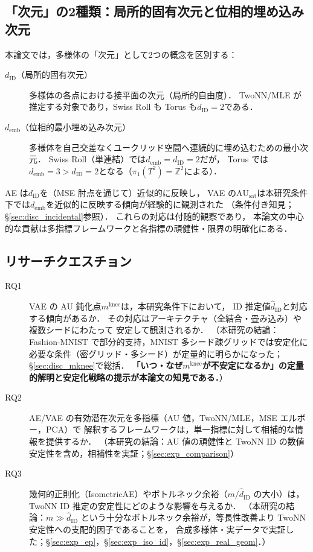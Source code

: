 \documentclass[11pt,a4paper]{jsarticle}
\newcommand{\dID}{d_{\mathrm{ID}}}
\newcommand{\AUsat}{\mathrm{AU}_{\mathrm{sat}}}
\newcommand{\mknee}{m^{\mathrm{knee}}}
\newcommand{\demb}{d_{\mathrm{emb}}}
\begin{document}
\subsection{「次元」の2種類：局所的固有次元と位相的埋め込み次元}\label{sec:intro_dim}

本論文では，多様体の「次元」として2つの概念を区別する：

\begin{description}
  \item[$\dID$（局所的固有次元）]
        多様体の各点における接平面の次元（局所的自由度）．
        TwoNN/MLE が推定する対象であり，Swiss Roll も Torus も$\dID = 2$である．
  \item[$\demb$（位相的最小埋め込み次元）]
        多様体を自己交差なくユークリッド空間へ連続的に埋め込むための最小次元．
        Swiss Roll（単連結）では$\demb = \dID = 2$だが，
        Torus では$\demb = 3 > \dID = 2$となる（$\pi_1(T^2) = \mathbb{Z}^2$による）．
\end{description}

AE は$\dID$を（MSE 肘点を通じて）近似的に反映し，
VAE の$\AUsat$は本研究条件下では$\demb$を近似的に反映する傾向が経験的に観測された
（条件付き知見；§\ref{sec:disc_incidental}参照）．
これらの対応は付随的観察であり，
本論文の中心的な貢献は多指標フレームワークと各指標の頑健性・限界の明確化にある．

\subsection{リサーチクエスチョン}\label{sec:intro_rq}

\begin{description}
  \item[RQ1] VAE の AU 鈍化点$\mknee$は，本研究条件下において，
             ID 推定値$\hat{d}_\mathrm{ID}$と対応する傾向があるか．
             その対応はアーキテクチャ（全結合・畳み込み）や複数シードにわたって
             安定して観測されるか．
             （本研究の結論：Fashion-MNIST で部分的支持，MNIST 多シード疎グリッドでは安定化に必要な条件（密グリッド・多シード）が定量的に明らかになった；
             §\ref{sec:disc_mknee}で総括．
             \textbf{「いつ・なぜ$\mknee$が不安定になるか」の定量的解明と安定化戦略の提示が本論文の知見である．}）
  \item[RQ2] AE/VAE の有効潜在次元を多指標（AU 値，TwoNN/MLE，MSE エルボー，PCA）で
             解釈するフレームワークは，単一指標に対して相補的な情報を提供するか．
             （本研究の結論：AU 値の頑健性と TwoNN ID の数値安定性を含め，相補性を実証；§\ref{sec:exp_comparison}）
  \item[RQ3] 幾何的正則化（IsometricAE）やボトルネック余裕（$m / \hat{d}_\mathrm{ID}$ の大小）は，
             TwoNN ID 推定の安定性にどのような影響を与えるか．
             （本研究の結論：$m \gg \hat{d}_\mathrm{ID}$ という十分なボトルネック余裕が，等長性改善より TwoNN 安定性への支配的因子であることを，
             合成多様体・実データで実証した；§\ref{sec:exp_ep}，§\ref{sec:exp_iso_id}，§\ref{sec:exp_real_geom}．）
\end{description}
\end{document}
